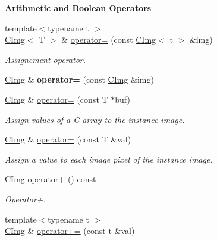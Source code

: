 \begin{Indent}{\bf Arithmetic and Boolean Operators}\par
{\em \label{_amgrpbc8b8f5d79bf90b42e4ef9fa9ed4a3af}
 }\begin{DoxyCompactItemize}
\item 
{\footnotesize template$<$typename t $>$ }\\\hyperlink{structcimg__library_1_1_c_img}{CImg}$<$ T $>$ \& \hyperlink{structcimg__library_1_1_c_img_af1cb9c09fa1e6501b8ccb5dbdd32a54f}{operator=} (const \hyperlink{structcimg__library_1_1_c_img}{CImg}$<$ t $>$ \&img)
\begin{DoxyCompactList}\small\item\em Assignement operator. \item\end{DoxyCompactList}\item 
\hypertarget{structcimg__library_1_1_c_img_a4b06be36505657d40277278ba0b53d44}{
\hyperlink{structcimg__library_1_1_c_img}{CImg} \& {\bfseries operator=} (const \hyperlink{structcimg__library_1_1_c_img}{CImg} \&img)}
\label{structcimg__library_1_1_c_img_a4b06be36505657d40277278ba0b53d44}

\item 
\hyperlink{structcimg__library_1_1_c_img}{CImg} \& \hyperlink{structcimg__library_1_1_c_img_a1408f736e379c076759744a159370ff1}{operator=} (const T $\ast$buf)
\begin{DoxyCompactList}\small\item\em Assign values of a C-\/array to the instance image. \item\end{DoxyCompactList}\item 
\hypertarget{structcimg__library_1_1_c_img_a1ef1b67d7211dda9186812e3da772cf0}{
\hyperlink{structcimg__library_1_1_c_img}{CImg} \& \hyperlink{structcimg__library_1_1_c_img_a1ef1b67d7211dda9186812e3da772cf0}{operator=} (const T \&val)}
\label{structcimg__library_1_1_c_img_a1ef1b67d7211dda9186812e3da772cf0}

\begin{DoxyCompactList}\small\item\em Assign a value to each image pixel of the instance image. \item\end{DoxyCompactList}\item 
\hyperlink{structcimg__library_1_1_c_img}{CImg} \hyperlink{structcimg__library_1_1_c_img_aa5d24dd9c504c68edc035fded5d0f42d}{operator+} () const 
\begin{DoxyCompactList}\small\item\em Operator+. \item\end{DoxyCompactList}\item 
\hypertarget{structcimg__library_1_1_c_img_a72daf1aaba633138c391e292de401552}{
{\footnotesize template$<$typename t $>$ }\\\hyperlink{structcimg__library_1_1_c_img}{CImg} \& \hyperlink{structcimg__library_1_1_c_img_a72daf1aaba633138c391e292de401552}{operator+=} (const t \&val)}
\label{structcimg__library_1_1_c_img_a72daf1aaba633138c391e292de401552}


\end{DoxyCompactItemize}
\end{Indent}
